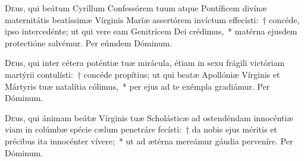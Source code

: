 \documentclass[vesperale_romanum.tex]{subfiles}
\begin{document}


\myrule



\duplexmtv


\oratio

 \lettrine{D}{e}us, qui beátum Cyríllum Confessórem tuum atque Pontíficem divínæ maternitátis beatíssimæ Vírginis Maríæ assertórem invíctum effecísti:~† concéde, ipso intercedénte; ut qui vere eam Genitrícem Dei crédimus,~* matérna ejusdem protectióne salvémur.
Per eúmdem Dóminum.



\oratio

\lettrine{D}{e}us, qui inter cétera poténtiæ tuæ mirácula, étiam in sexu frágili victóriam martýrii contulísti:~† concéde propítius; ut qui beatæ Apollóniæ Vírginis et Mártyris tuæ natalítia cólimus,~* per ejus ad te exémpla gradiámur. Per Dóminum.

\capitdeseqquad

\myrule

\newpage



\duplex

\oratio

\lettrine{D}{e}us, qui  ánimam beátæ Vírginis tuæ Scholásticæ ad ostendéndam innocéntiæ viam in colúmbæ spécie cælum penetráre fecísti:~† da nobis ejus méritis et précibus ita innocénter vívere;~* ut ad ætérna mereámur gáudia perveníre.
Per Dóminum.
\end{document}
